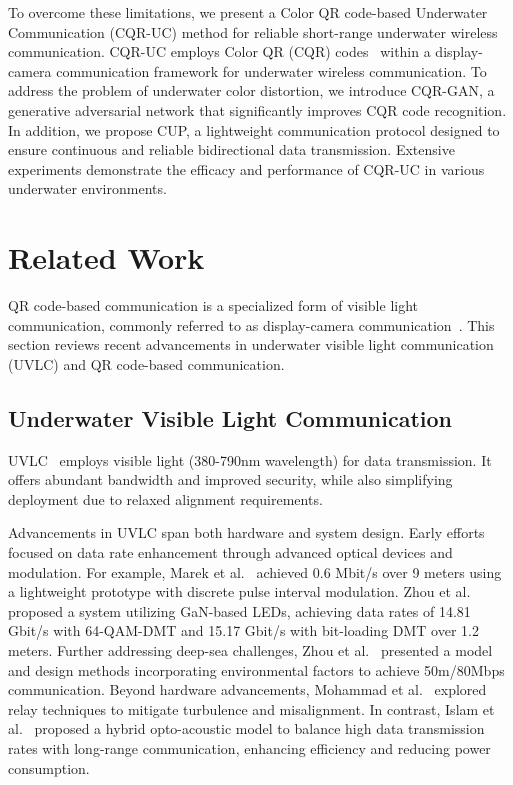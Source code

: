 \documentclass[preprint,12pt]{elsarticle}
\begin{document}
To overcome these limitations, we present a Color QR code-based Underwater Communication (CQR-UC) method for reliable short-range underwater wireless communication. CQR-UC employs Color QR (CQR) codes~\cite{taveerad2015development} within a display-camera communication framework for underwater wireless communication. To address the problem of underwater color distortion, we introduce CQR-GAN, a generative adversarial network that significantly improves CQR code recognition. In addition, we propose CUP, a lightweight communication protocol designed to ensure continuous and reliable bidirectional data transmission. Extensive experiments demonstrate the efficacy and performance of CQR-UC in various underwater environments.

\section{Related Work}
QR code-based communication is a specialized form of visible light communication, commonly referred to as display-camera communication~\cite{sewpersadh2024Wireless}. This section reviews recent advancements in underwater visible light communication (UVLC) and QR code-based communication.

\subsection{Underwater Visible Light Communication}
UVLC~\cite{Ali2022Underwater} employs visible light (380-790nm wavelength) for data transmission. It offers abundant bandwidth and improved security, while also simplifying deployment due to relaxed alignment requirements.

Advancements in UVLC span both hardware and system design. Early efforts focused on data rate enhancement through advanced optical devices and modulation. For example, Marek et al.~\cite{doniec2010aquaoptical} achieved 0.6 Mbit/s over 9 meters using a lightweight prototype with discrete pulse interval modulation. Zhou et al.~\cite{Zhou2019Frequency} proposed a system utilizing GaN-based LEDs, achieving data rates of 14.81 Gbit/s with 64-QAM-DMT and 15.17 Gbit/s with bit-loading DMT over 1.2 meters. Further addressing deep-sea challenges, Zhou et al.~\cite{Zhou2022Attenuation} presented a model and design methods incorporating environmental factors to achieve 50m/80Mbps communication. Beyond hardware advancements, Mohammad et al.~\cite{ali2022Wireless} explored relay techniques to mitigate turbulence and misalignment. In contrast, Islam et al.~\cite{islam2021Reliability} proposed a hybrid opto-acoustic model to balance high data transmission rates with long-range communication, enhancing efficiency and reducing power consumption.
\end{document}
